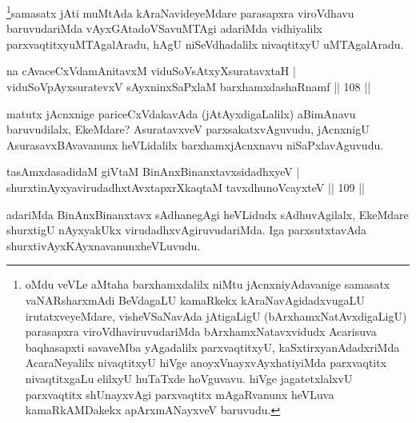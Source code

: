 \begin{artha}
\footnote{oMdu veVLe aMtaha barxhamxdalilx niMtu jAcnxniyAdavanige samasatx vaNARsharxmAdi BeVdagaLU kamaRkekx kAraNavAgidadxvugaLU irutatxveyeMdare, visheVSaNavAda jAtigaLigU (bArxhamxNatAvxdigaLigU) parasapxra viroVdhaviruvudariMda bArxhamxNatavxvidudx Acarisuva baqhasapxti savaveMba yAgadalilx parxvaqtitxyU, kaSxtirxyanAdadxriMda AcaraNeyalilx nivaqtitxyU hiVge anoyxVnayxvAyxhatiyiMda parxvaqtitx nivaqtitxgaLu elilxyU huTaTxde hoVguvavu. hiVge jagatetxlalxvU parxvaqtitx shUnayxvAgi parxvaqtitx mAgaRvanunx heVLuva kamaRkAMDakekx apArxmANayxveV baruvudu.}samasatx jAti muMtAda kAraNavideyeMdare parasapxra viroVdhavu baruvudariMda vAyxGAtadoVSavuMTAgi adariMda vidhiyalilx parxvaqtitxyuMTAgalAradu, hAgU niSeVdhadalilx nivaqtitxyU uMTAgalAradu.
\end{artha}


\begin{shl}
na cAvaceCxVdamAnitavxM viduSoV\s sAtxyXsuratavxtaH  | \\
viduSoV\s pAyxsuratevxV sAyxninxSaPxlaM barxhamxdashaRnamf \hfill||  108 ||  
\end{shl}

\begin{artha}
matutx jAcnxnige pariceCxVdakavAda (jAtAyxdigaLalilx) aBimAnavu baruvudilalx, EkeMdare? AsuratavxveV parxsakatxvAguvudu, jAcnxnigU AsurasavxBAvavanunx heVLidalilx barxhamxjAcnxnavu niSaPxlavAguvudu.
\end{artha}


\begin{shl}
tasAmxdasadidaM giVtaM BinAnxBinanxtavxsidadhxyeV  | \\
shurxtinAyxyavirudadhxtAvxtapxrXkaqtaM tavxdhunoVcayxteV \hfill||  109 ||  
\end{shl}

\begin{artha}
adariMda BinAnxBinanxtavx sAdhanegAgi heVLidudx sAdhuvAgilalx, EkeMdare shurxtigU nAyxyakUkx virudadhxvAgiruvudariMda. Iga parxsutxtavAda shurxtivAyxKAyxnavanunx\break heVLuvudu.
\end{artha}



